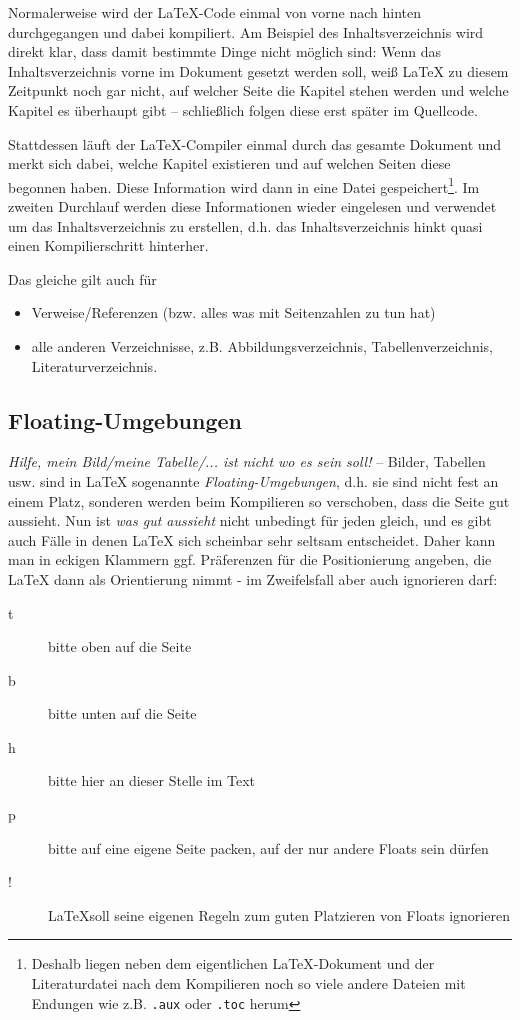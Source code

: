 			
			Normalerweise wird der \LaTeX-Code einmal von vorne nach hinten durchgegangen und dabei kompiliert.
%			
			Am Beispiel des Inhaltsverzeichnis wird direkt klar, dass damit bestimmte Dinge nicht möglich sind:
				Wenn das Inhaltsverzeichnis vorne im Dokument gesetzt werden soll, weiß \LaTeX{} zu diesem Zeitpunkt noch gar nicht, auf welcher Seite die Kapitel stehen werden und welche Kapitel es überhaupt gibt -- schließlich folgen diese erst später im Quellcode.
			
			Stattdessen läuft der \LaTeX-Compiler einmal durch das gesamte Dokument und merkt sich dabei, welche Kapitel existieren und auf welchen Seiten diese begonnen haben.
				Diese Information wird dann in eine Datei gespeichert\footnote{Deshalb liegen neben dem eigentlichen \LaTeX-Dokument und der Literaturdatei nach dem Kompilieren noch so viele andere Dateien mit Endungen wie z.B. \lstinline|.aux| oder \lstinline|.toc| herum}.
%			
			Im zweiten Durchlauf werden diese Informationen wieder eingelesen und verwendet um das Inhaltsverzeichnis zu erstellen, d.h. das Inhaltsverzeichnis hinkt quasi einen Kompilierschritt hinterher.
			\bigskip
			
			\noindent Das gleiche gilt auch für
			\begin{itemize}
			\item Verweise/Referenzen (bzw. alles was mit Seitenzahlen zu tun hat)
			\item alle anderen Verzeichnisse, z.B. Abbildungsverzeichnis, Tabellenverzeichnis, Literaturverzeichnis.
			\end{itemize}
		
		

		
		\subsection{Floating-Umgebungen}\label{sec:wissen:float}
			\textit{Hilfe, mein Bild/meine Tabelle/... ist nicht wo es sein soll!} --
			Bilder, Tabellen usw. sind in \LaTeX{} sogenannte \emph{Floating-Umgebungen}, d.h. sie sind nicht fest an einem Platz, sonderen werden beim Kompilieren so verschoben, dass die Seite gut aussieht.
			Nun ist \emph{was gut aussieht} nicht unbedingt für jeden gleich, und es gibt auch Fälle in denen \LaTeX{} sich scheinbar sehr seltsam entscheidet.
			Daher kann man in eckigen Klammern ggf. Präferenzen für die Positionierung angeben, die \LaTeX{} dann als Orientierung nimmt - im Zweifelsfall aber auch ignorieren darf:
			
			\begin{description}
			\item[t] bitte oben auf die Seite
			\item[b] bitte unten auf die Seite
			\item[h] bitte hier an dieser Stelle im Text
			\item[p] bitte auf eine eigene Seite packen, auf der nur andere Floats sein dürfen
			\item[!] \LaTeX soll seine eigenen Regeln zum guten Platzieren von Floats ignorieren
			\end{description}
			

